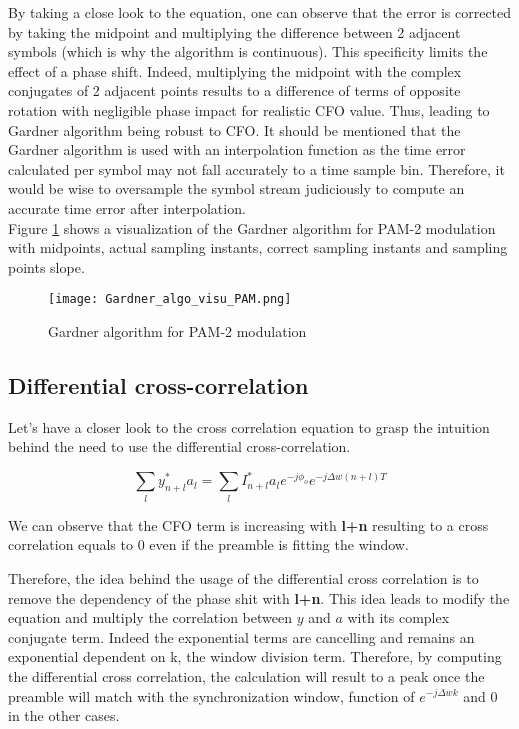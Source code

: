 By taking a close look to the equation, one can observe that the error is corrected by taking the midpoint and multiplying the difference between 2 adjacent symbols (which is why the algorithm is
continuous). This specificity limits the effect of a phase shift.  Indeed, multiplying the midpoint with the complex conjugates of 2 adjacent points results to 
a difference of terms of opposite rotation with negligible phase impact for realistic CFO value.  Thus, leading to Gardner algorithm being robust to CFO.\newline
It should be mentioned that the Gardner algorithm is used with an interpolation function as the time error calculated per symbol 
may not fall accurately to a time sample bin.  Therefore, it would be wise to oversample the symbol stream judiciously to compute an 
accurate time error after interpolation. \\
Figure \ref{fig:Gardner_algo_visu_PAM} shows a visualization of the Gardner algorithm for PAM-2 modulation with midpoints, actual sampling instants,
correct sampling instants and sampling points slope.
\begin{figure}[H]
    \centering
    \texttt{[image: Gardner\_algo\_visu\_PAM.png]}
    \caption{Gardner algorithm for PAM-2 modulation}
    \label{fig:Gardner_algo_visu_PAM}
\end{figure}


\subsection{Differential cross-correlation}

Let's have a closer look to the cross correlation equation to grasp the intuition behind the need to use the differential cross-correlation.

\begin{equation*}
    \sum_{l}{y^{*}_{n+l}a_{l}} = \sum_{l}{I^{*}_{n+l}a_{l}e^{-j\phi_{o}}e^{-j\Delta w(n+l)T}}
\end{equation*}

We can observe that the CFO term is increasing with \textbf{l+n} resulting to a cross correlation equals to 0 even if the preamble is fitting
the window.

Therefore, the idea behind the usage of the differential cross correlation is to remove the dependency of the phase shit with \textbf{l+n}.
This idea leads to modify the equation and multiply the correlation between $y$ and $a$ with its complex conjugate term. Indeed the exponential 
terms are cancelling and remains an exponential dependent on k, the window division term.
Therefore, by computing the differential cross correlation, the calculation will result to a peak once the preamble will match with the synchronization
 window, function of $e^{-j\Delta wk}$ and 0 in the other cases.
 

